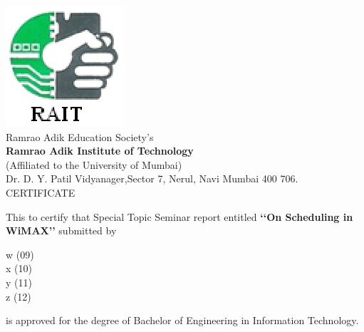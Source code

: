\cleardoublepage \nonumber
\begin{center}
\includegraphics{raitlogo.eps}\\
Ramrao Adik Education Society's\\
\large {\textbf{Ramrao Adik Institute of Technology}}\\
\small(Affiliated to the University of Mumbai)\\
Dr. D. Y. Patil Vidyanager,Sector 7, Nerul, Navi Mumbai 400
706.\\\vspace{0.1in} \Large CERTIFICATE
\end{center}
\vspace{0.1in}\large This to certify that Special Topic Seminar
report entitled \textbf{\lq\lq On Scheduling in WiMAX\rq\rq}
submitted by
\begin{center}
 w (09)\\x (10) \\y (11) \\z (12)
\end{center}
is approved for the degree of Bachelor of Engineering in Information
Technology.\\

